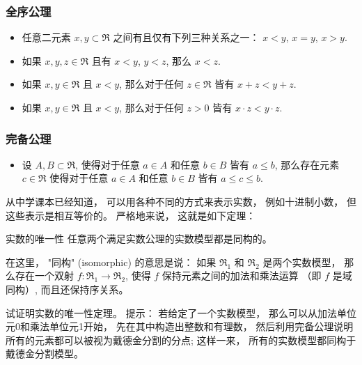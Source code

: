 \subsubsection{全序公理}
\begin{itemize}
\item 任意二元素 $x,y\subset\mathfrak{R}$ 之间有且仅有下列三种关系之一： $x<y$, $x=y$, $x>y$.
\item 如果 $x,y,z\in\mathfrak{R}$ 且有 $x<y$, $y<z$, 那么 $x<z$.
\item 如果 $x,y\in\mathfrak{R}$ 且 $x<y$, 那么对于任何 $z\in\mathfrak{R}$ 皆有 $x+z<y+z$.
\item 如果 $x,y\in\mathfrak{R}$ 且 $x<y$, 那么对于任何 $z>0$ 皆有 $x\cdot z<y\cdot z$.
\end{itemize}

\subsubsection{完备公理}
\begin{itemize}
\item 设 $A,B\subset\mathfrak{R}$, 使得对于任意 $a\in A$ 和任意 $b\in B$ 皆有 $a\leq b$, 那么存在元素 $c\in\mathfrak{R}$ 使得对于任意 $a\in A$ 和任意 $b\in B$ 皆有 $a\leq c\leq b$.
\end{itemize}

从中学课本已经知道， 可以用各种不同的方式来表示实数， 例如十进制小数， 但这些表示是相互等价的。 严格地来说， 这就是如下定理：
\begin{theorem}{实数的唯一性}
任意两个满足实数公理的实数模型都是同构的。
\end{theorem}
在这里， "同构" (isomorphic) 的意思是说： 如果 $\mathfrak{R}_1$ 和 $\mathfrak{R}_2$ 是两个实数模型， 那么存在一个双射 $f:\mathfrak{R}_1\to \mathfrak{R}_2$, 使得 $f$ 保持元素之间的加法和乘法运算 （即 $f$ 是域同构）, 而且还保持序关系。

\begin{exercise}{}
试证明实数的唯一性定理。 提示： 若给定了一个实数模型， 那么可以从加法单位元0和乘法单位元1开始， 先在其中构造出整数和有理数， 然后利用完备公理说明所有的元素都可以被视为戴德金分割的分点; 这样一来， 所有的实数模型都同构于戴德金分割模型。
\end{exercise}